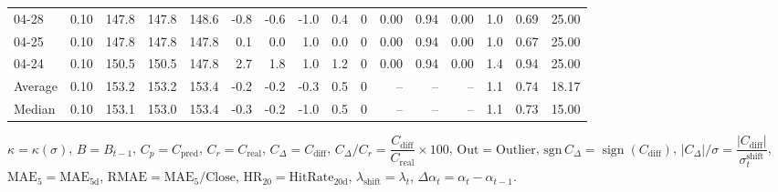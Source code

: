 \begin{threeparttable}
{\begin{tabular}{lrrrrrrrrrrrrrrr}
  04-28 &     0.10 & 147.8 & 147.8 & 148.6 &       -0.8 &           -0.6 &                     -1.0 &                 0.4 &              0 &       0.00 &      0.94 &           0.00 &              1.0 &            0.69 &                  25.00 \\
  04-25 &     0.10 & 147.8 & 147.8 & 147.8 &        0.1 &            0.0 &                      1.0 &                 0.0 &              0 &       0.00 &      0.94 &           0.00 &              1.0 &            0.67 &                  25.00 \\
  04-24 &     0.10 & 150.5 & 150.5 & 147.8 &        2.7 &            1.8 &                      1.0 &                 1.2 &              0 &       0.00 &      0.94 &           0.00 &              1.4 &            0.94 &                  25.00 \\
Average &     0.10 & 153.2 & 153.2 & 153.4 &       -0.2 &           -0.2 &                     -0.3 &                 0.5 &              0 &         -- &        -- &             -- &              1.1 &            0.74 &                  18.17 \\
 Median &     0.10 & 153.1 & 153.0 & 153.4 &       -0.3 &           -0.2 &                     -1.0 &                 0.5 &              0 &         -- &        -- &             -- &              1.1 &            0.73 &                  15.00 \\
\bottomrule
\end{tabular}
}
\begin{tablenotes}\footnotesize
\item $\kappa=\kappa(\sigma)$, $B=B_{t-1}$, $C_p=C_{\text{pred}}$, $C_r=C_{\text{real}}$, $C_\Delta=C_{\text{diff}}$, $C_\Delta/C_r=\dfrac{C_{\text{diff}}}{C_{\text{real}}}\times100$, $\mathrm{Out}=\text{Outlier}$, $\mathrm{sgn}\,C_\Delta=\operatorname{sign}(C_{\text{diff}})$, $|C_\Delta|/\sigma=\dfrac{|C_{\text{diff}}|}{\sigma_t^{\text{shift}}}$, $\mathrm{MAE}_5=\mathrm{MAE}_{5\text{d}}$, $\mathrm{RMAE}= \mathrm{MAE}_5 / \text{Close}$, $\mathrm{HR}_{20}=\mathrm{HitRate}_{20\text{d}}$, 
$\lambda_{\text{shift}}=\lambda_t$, 
$\Delta\alpha_t=\alpha_t-\alpha_{t-1}$.
\end{tablenotes}
\end{threeparttable}
\endgroup

